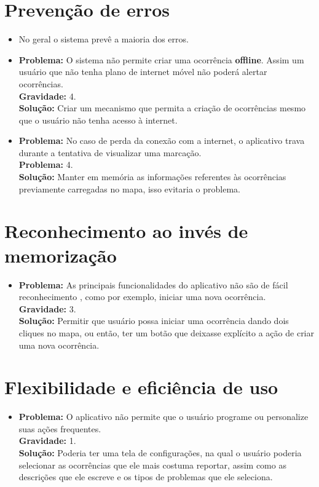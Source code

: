 \documentclass[a4paper,12pt,twoside]{report}
\begin{document}
\section{Prevenção de erros}
\begin{itemize}
  \item No geral o sistema prevê a maioria dos erros.
  \item \textbf{Problema:} O sistema não permite criar uma ocorrência \textbf{offline}. Assim um
  usuário que não tenha plano de internet móvel não poderá alertar ocorrências.\\
  \textbf{Gravidade:} 4.\\
  \textbf{Solução:} Criar um mecanismo que permita a criação de ocorrências mesmo que o
  usuário não tenha acesso à internet.
\item \textbf{Problema:} No caso de perda da conexão com a internet, o aplicativo trava durante a
  tentativa de visualizar uma marcação.\\
  \textbf{Problema:} 4.\\
  \textbf{Solução:} Manter em memória as informações referentes às
  ocorrências previamente carregadas no mapa, isso evitaria o problema.
\end{itemize}

\section{Reconhecimento ao invés de memorização}
\begin{itemize}
\item \textbf{Problema:} As principais funcionalidades do aplicativo não são de fácil reconhecimento
  , como por exemplo, iniciar uma nova ocorrência.\\
  \textbf{Gravidade:} 3.\\
  \textbf{Solução:} Permitir que usuário possa iniciar uma ocorrência dando dois cliques no
  mapa, ou então, ter um botão que deixasse explícito a ação de criar uma nova
  ocorrência.
\end{itemize}

\section{Flexibilidade e eficiência de uso}
\begin{itemize}
\item \textbf{Problema:} O aplicativo não permite que o usuário programe ou personalize suas
  ações frequentes.\\
  \textbf{Gravidade:} 1.\\
  \textbf{Solução:} Poderia ter uma tela de configurações, na qual o usuário poderia selecionar
  as ocorrências que ele mais costuma reportar, assim como as descrições que ele
  escreve e os tipos de problemas que ele seleciona.
\end{itemize}
\end{document}
